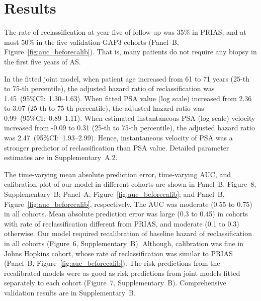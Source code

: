 \section{Results}
The rate of reclassification at year five of follow-up was 35\% in PRIAS, and at most 50\% in the five validation GAP3 cohorts (Panel~B, Figure~\ref{fig:auc_beforecalib}). That is, many patients do not require any biopsy in the first five years of AS. 

In the fitted joint model, when patient age increased from 61 to 71 years (25-th to 75-th percentile), the adjusted hazard ratio of reclassification was 1.45~(95\%CI:~1.30--1.63). When fitted PSA value (log scale) increased from 2.36 to 3.07 (25-th to 75-th percentile), the adjusted hazard ratio was 0.99~(95\%CI:~0.89--1.11). When estimated instantaneous PSA (log scale) velocity increased from -0.09 to 0.31 (25-th to 75-th percentile), the adjusted hazard ratio was 2.47~(95\%CI:~1.93--2.99). Hence, instantaneous velocity of PSA was a stronger predictor of reclassification than PSA value. Detailed parameter estimates are in Supplementary~A.2.

The time-varying mean absolute prediction error, time-varying AUC, and calibration plot of our model in different cohorts are shown in Panel~B, Figure~8, Supplementary~B; Panel~A, Figure~\ref{fig:auc_beforecalib}; and Panel~B, Figure~\ref{fig:auc_beforecalib}, respectively. The AUC was moderate (0.55 to 0.75) in all cohorts. Mean absolute prediction error was large (0.3 to 0.45) in cohorts with rate of reclassification different from PRIAS, and moderate (0.1 to 0.3) otherwise. Our model required recalibration of baseline hazard of reclassification in all cohorts (Figure~6, Supplementary~B). Although, calibration was fine in Johns Hopkins cohort, whose rate of reclassification was similar to PRIAS (Panel~B, Figure~\ref{fig:auc_beforecalib}). The risk predictions from the recalibrated models were as good as risk predictions from joint models fitted separately to each cohort (Figure~7, Supplementary~B). Comprehensive validation results are in Supplementary~B.

